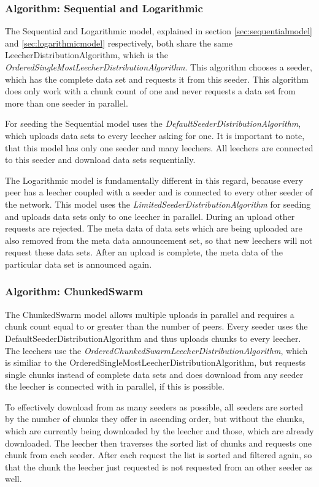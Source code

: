 \subsubsection{Algorithm: Sequential and Logarithmic}
\label{subsubsec:seqlog}
The Sequential and Logarithmic model, explained in section \ref{sec:sequentialmodel} and \ref{sec:logarithmicmodel} respectively, both share the same LeecherDistributionAlgorithm, which is the \emph{OrderedSingleMostLeecherDistributionAlgorithm}. This algorithm chooses a seeder, which has the complete data set and requests it from this seeder. This algorithm does only work with a chunk count of one and never requests a data set from more than one seeder in parallel.

For seeding the Sequential model uses the \emph{DefaultSeederDistributionAlgorithm}, which uploads data sets to every leecher asking for one. It is important to note, that this model has only one seeder and many leechers. All leechers are connected to this seeder and download data sets sequentially. 

The Logarithmic model is fundamentally different in this regard, because every peer has a leecher coupled with a seeder and is connected to every other seeder of the network. This model uses the \emph{LimitedSeederDistributionAlgorithm} for seeding and uploads data sets only to one leecher in parallel. During an upload other requests are rejected. The meta data of data sets which are being uploaded are also removed from the meta data announcement set, so that new leechers will not request these data sets. After an upload is complete, the meta data of the particular data set is announced again.

\subsubsection{Algorithm: ChunkedSwarm}
\label{subsubsec:chunkedswarm}
The ChunkedSwarm model allows multiple uploads in parallel and requires a chunk count equal to or greater than the number of peers. Every seeder uses the DefaultSeederDistributionAlgorithm and thus uploads chunks to every leecher. The leechers use the \emph{OrderedChunkedSwarmLeecherDistributionAlgorithm}, which is similiar to the OrderedSingleMostLeecherDistributionAlgorithm, but requests single chunks instead of complete data sets and does download from any seeder the leecher is connected with in parallel, if this is possible. 

To effectively download from as many seeders as possible, all seeders are sorted by the number of chunks they offer in ascending order, but without the chunks, which are currently being downloaded by the leecher and those, which are already downloaded. The leecher then traverses the sorted list of chunks and requests one chunk from each seeder. After each request the list is sorted and filtered again, so that the chunk the leecher just requested is not requested from an other seeder as well. 

